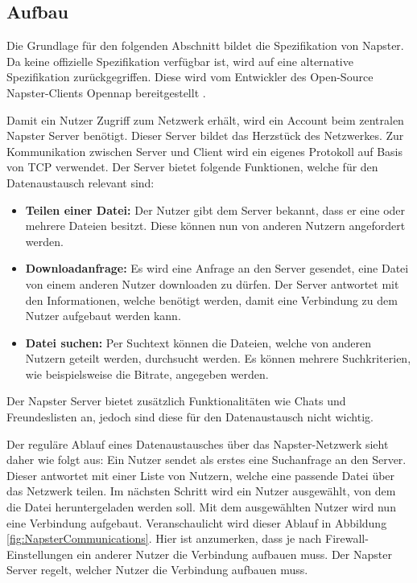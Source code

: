\subsection{Aufbau}
\label{sec:NapsterAufbau}
Die Grundlage für den folgenden Abschnitt bildet die Spezifikation von Napster. Da keine offizielle Spezifikation verfügbar ist, wird auf eine alternative Spezifikation zurückgegriffen. Diese wird vom Entwickler des Open-Source Napster-Clients Opennap bereitgestellt \parencite{napsterSpecification}. 

Damit ein Nutzer Zugriff zum Netzwerk erhält, wird ein Account beim zentralen Napster Server benötigt. Dieser Server bildet das Herzstück des Netzwerkes. Zur Kommunikation zwischen Server und Client wird ein eigenes Protokoll auf Basis von TCP verwendet. Der Server bietet folgende Funktionen, welche für den Datenaustausch relevant sind:

\begin{itemize}
    \item \textbf{Teilen einer Datei:} Der Nutzer gibt dem Server bekannt, dass er eine oder mehrere Dateien besitzt. Diese können nun von anderen Nutzern angefordert werden. 
    \item \textbf{Downloadanfrage:} Es wird eine Anfrage an den Server gesendet, eine Datei von einem anderen Nutzer downloaden zu dürfen. Der Server antwortet mit den Informationen, welche benötigt werden, damit eine Verbindung zu dem Nutzer aufgebaut werden kann.
    \item \textbf{Datei suchen:} Per Suchtext können die Dateien, welche von anderen Nutzern geteilt werden, durchsucht werden. Es können mehrere Suchkriterien, wie beispielsweise die Bitrate, angegeben werden.
\end{itemize}
Der Napster Server bietet zusätzlich Funktionalitäten wie Chats und Freundeslisten an, jedoch sind diese für den Datenaustausch nicht wichtig.

Der reguläre Ablauf eines Datenaustausches über das Napster-Netzwerk sieht daher wie folgt aus: Ein Nutzer sendet als erstes eine Suchanfrage an den Server. Dieser antwortet mit einer Liste von Nutzern, welche eine passende Datei über das Netzwerk teilen. Im nächsten Schritt wird ein Nutzer ausgewählt, von dem die Datei heruntergeladen werden soll. Mit dem ausgewählten Nutzer wird nun eine Verbindung aufgebaut. Veranschaulicht wird dieser Ablauf in Abbildung \ref{fig:NapsterCommunications}. Hier ist anzumerken, dass je nach Firewall-Einstellungen ein anderer Nutzer die Verbindung aufbauen muss. Der Napster Server regelt, welcher Nutzer die Verbindung aufbauen muss. 

